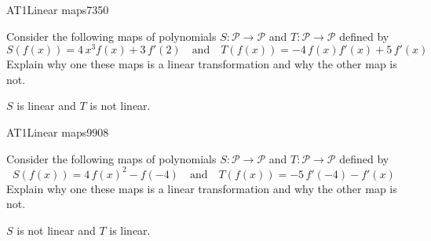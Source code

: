 \begin{exercise}{AT1}{Linear maps}{7350} 
\begin{exerciseStatement} 

 Consider the following maps of polynomials \(S:\mathcal{P}\rightarrow\mathcal{P}\) and \(T:\mathcal{P}\rightarrow\mathcal{P}\) defined by \[
            S(f(x))=
                    4 \, x^{3} f\left(x\right) + 3 \, f'\left(2\right)
                \hspace{1em} \text{and} \hspace{1em}
            T(f(x))=
                    -4 \, f\left(x\right) f'\left(x\right) + 5 \, f'\left(x\right)
        \] Explain why one these maps is a linear transformation and why the other map is not. 

 \end{exerciseStatement}
 \begin{exerciseAnswer} 

\(S\) is linear and \(T\) is not linear.

 \end{exerciseAnswer}
 \end{exercise}


\begin{exercise}{AT1}{Linear maps}{9908} 
\begin{exerciseStatement} 

 Consider the following maps of polynomials \(S:\mathcal{P}\rightarrow\mathcal{P}\) and \(T:\mathcal{P}\rightarrow\mathcal{P}\) defined by \[
            S(f(x))=
                    4 \, f\left(x\right)^{2} - f\left(-4\right)
                \hspace{1em} \text{and} \hspace{1em}
            T(f(x))=
                    -5 \, f'\left(-4\right) - f'\left(x\right)
        \] Explain why one these maps is a linear transformation and why the other map is not. 

 \end{exerciseStatement}
 \begin{exerciseAnswer} 

\(S\) is not linear and \(T\) is linear.

 \end{exerciseAnswer}
 \end{exercise}


